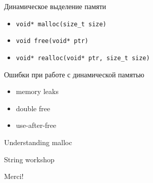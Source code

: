 \documentclass[10pt,pdf,hyperref={unicode}]{beamer}
\begin{document}
\begin{frame}{Динамическое выделение памяти}
\begin{itemize}
    \item \lstinline{void* malloc(size_t size)}
    \item \lstinline{void free(void* ptr)}
    \item \lstinline{void* realloc(void* ptr, size_t size)}
\end{itemize}
\end{frame}

\begin{frame}{Ошибки при работе с динамической памятью}
\begin{itemize}
    \item memory leaks
    \item double free
    \item use-after-free
\end{itemize}
\end{frame}

\begin{frame}{Understanding malloc}
\center{}
\end{frame}

\begin{frame}
\center\Huge String workshop
\end{frame}


\begin{frame}
\center\Huge{Merci!}
\end{frame}
\end{document}
